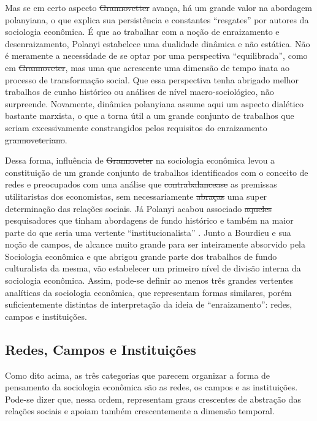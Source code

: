 Mas se em certo aspecto \sout{Grannovetter} avança, há um grande valor na
abordagem polanyiana, o que explica sua persistência e constantes 
``resgates'' por autores da sociologia econômica. É que ao trabalhar
com a noção de enraizamento e desenraizamento, Polanyi estabelece uma
dualidade dinâmica e não estática. Não é meramente a necessidade de se optar por
uma perspectiva ``equilibrada'', como em \sout{Grannoveter}, mas uma que acrescente uma dimensão de tempo inata ao processo de transformação social. Que essa perspectiva tenha abrigado melhor trabalhos de cunho
histórico ou análises de nível macro-sociológico, não surpreende. Novamente, 
dinâmica polanyiana assume aqui um aspecto dialético bastante marxista, o que a torna útil a um grande conjunto de trabalhos
que seriam excessivamente constrangidos pelos requisitos do enraizamento \sout{grannoveteriano}.

Dessa forma,  influência de \sout{Grannoveter} na sociologia econômica levou a constituição de um grande conjunto de trabalhos identificados com o conceito de redes e preocupados com uma análise que \sout{contrabalancease} as premissas utilitaristas dos economistas, sem necessariamente \sout{abraças} uma super determinação das relações sociais. Já Polanyi acabou associado \sout{aqueles} pesquisadores que tinham abordagens de fundo histórico  e também na maior parte do que seria uma vertente ``institucionalista'' . Junto a Bourdieu e sua noção de campos, de alcance muito grande para ser inteiramente absorvido pela Sociologia econômica e que abrigou grande parte dos trabalhos de fundo culturalista da mesma, vão estabelecer um primeiro nível de divisão interna da sociologia econômica. Assim, pode-se definir ao menos três grandes vertentes analíticas da sociologia econômica, que representam formas similares, porém suficientemente distintas de interpretação da ideia de ``enraizamento'': redes, campos e instituições.

\subsection{Redes, Campos e Instituições}
Como dito acima, as três categorias que parecem organizar a forma
de pensamento da sociologia econômica são as redes, os campos e as
instituições. Pode-se dizer que, nessa ordem, representam graus crescentes de abstração das relações sociais e apoiam também crescentemente a dimensão temporal.

